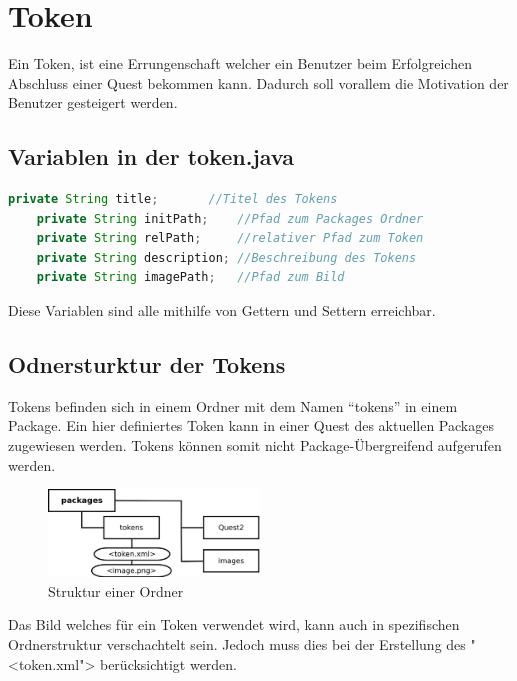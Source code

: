 \section{Token}
Ein Token, ist eine Errungenschaft welcher ein Benutzer beim Erfolgreichen Abschluss einer Quest bekommen kann. Dadurch soll vorallem die Motivation der Benutzer gesteigert werden. 

\subsection{Variablen in der token.java}

\begin{lstlisting}[language=JAVA]
	private String title;		//Titel des Tokens
	private String initPath;	//Pfad zum Packages Ordner 
	private String relPath;		//relativer Pfad zum Token
	private String description;	//Beschreibung des Tokens
	private String imagePath;	//Pfad zum Bild

\end{lstlisting}
Diese Variablen sind alle mithilfe von Gettern und Settern erreichbar.

\subsection{Odnersturktur der Tokens}
Tokens befinden sich in einem Ordner mit dem Namen "`tokens"' in einem Package. Ein hier definiertes Token kann in einer Quest des aktuellen Packages zugewiesen werden. Tokens können somit nicht Package-Übergreifend aufgerufen werden.

\begin{figure}[h] 
  \centering
     \includegraphics[width=0.5\textwidth]{./media/images/quest/token.png}
  \caption{Struktur einer Ordner}
  \label{fig:struct_token}
\end{figure}

Das Bild welches für ein Token verwendet wird, kann auch in spezifischen Ordnerstruktur verschachtelt sein. Jedoch muss dies bei der Erstellung des "<token.xml"> berücksichtigt werden.